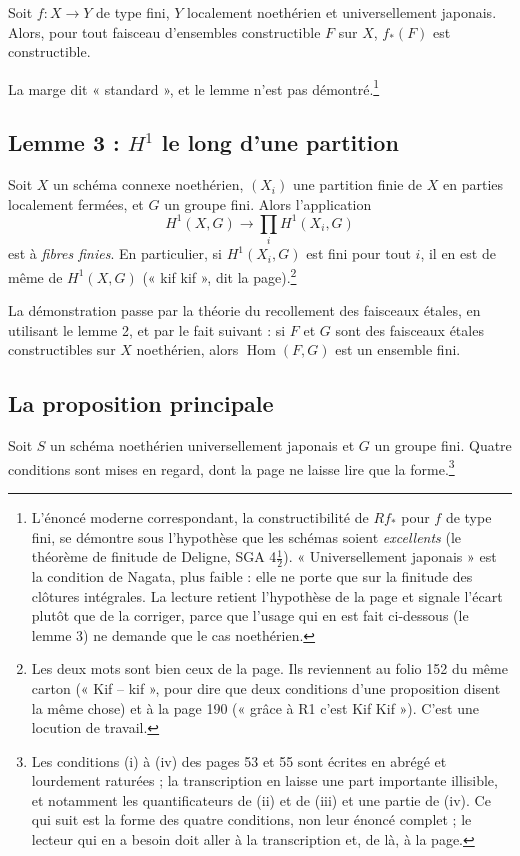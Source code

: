 \documentclass[11pt,a4paper]{article}
\begin{document}
Soit $f : X \to Y$ de type fini, $Y$ localement noethérien et universellement
japonais. Alors, pour tout faisceau d'ensembles constructible $F$ sur $X$,
$f_{*}(F)$ est constructible.

La marge dit « standard », et le lemme n'est pas démontré.\footnote{L'énoncé
moderne correspondant, la constructibilité de $R f_{*}$ pour $f$ de type
fini, se démontre sous l'hypothèse que les schémas soient \emph{excellents}
(le théorème de finitude de Deligne, SGA 4$\frac{1}{2}$). « Universellement
japonais » est la condition de Nagata, plus faible : elle ne porte que sur la
finitude des clôtures intégrales. La lecture retient l'hypothèse de la page et
signale l'écart plutôt que de la corriger, parce que l'usage qui en est fait
ci-dessous (le lemme 3) ne demande que le cas noethérien.}

\subsection*{Lemme 3 : $H^{1}$ le long d'une partition}

Soit $X$ un schéma connexe noethérien, $(X_{i})$ une partition finie de $X$ en
parties localement fermées, et $G$ un groupe fini. Alors l'application
\[
  H^{1}(X, G) \longrightarrow \prod_{i} H^{1}(X_{i}, G)
\]
est à \emph{fibres finies}. En particulier, si $H^{1}(X_{i}, G)$ est fini pour
tout $i$, il en est de même de $H^{1}(X, G)$ (« kif kif », dit la
page).\footnote{Les deux mots sont bien ceux de la page. Ils reviennent au
folio 152 du même carton (« Kif -- kif », pour dire que deux conditions d'une
proposition disent la même chose) et à la page 190 (« grâce à R1 c'est Kif
Kif »). C'est une locution de travail.}

La démonstration passe par la théorie du recollement des faisceaux étales, en
utilisant le lemme 2, et par le fait suivant : si $F$ et $G$ sont des faisceaux
étales constructibles sur $X$ noethérien, alors $\operatorname{Hom}(F, G)$ est
un ensemble fini.

\subsection*{La proposition principale}

Soit $S$ un schéma noethérien universellement japonais et $G$ un groupe fini.
Quatre conditions sont mises en regard, dont la page ne laisse lire que la
forme.\footnote{Les conditions (i) à (iv) des pages 53 et 55 sont écrites en
abrégé et lourdement raturées ; la transcription en laisse une part importante
illisible, et notamment les quantificateurs de (ii) et de (iii) et une partie
de (iv). Ce qui suit est la forme des quatre conditions, non leur énoncé
complet ; le lecteur qui en a besoin doit aller à la transcription et, de là, à
la page.}
\end{document}
